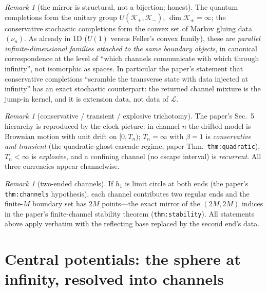 \documentclass[11pt]{article}
\theoremstyle{remark}
\newtheorem{remark}[theorem]{Remark}
\begin{document}
\begin{remark}[the mirror is structural, not a bijection; honest]
The quantum completions form the unitary group
$U(\mathcal K_{+},\mathcal K_{-})$, $\dim\mathcal K_{\pm}=\infty$; the
conservative stochastic completions form the convex set of Markov
gluing data $(\nu_{n})$.  As already in 1D ($U(1)$ versus Feller's
convex family), these are \emph{parallel infinite-dimensional families
attached to the same boundary objects}, in canonical correspondence at
the level of ``which channels communicate with which through
infinity'', not isomorphic as spaces.  In particular the paper's
statement that conservative completions ``scramble the transverse
state with data injected at infinity'' has an exact stochastic
counterpart: the returned channel mixture is the jump-in kernel, and it
is extension data, not data of $\mathcal L$.
\end{remark}

\begin{remark}[conservative / transient / explosive trichotomy]
The paper's Sec.~5 hierarchy is reproduced by the clock picture: in
channel $n$ the drifted model is Brownian motion with unit drift on
$[0,T_{n})$; $T_{n}=\infty$ with $\beta=1$ is \emph{conservative and
transient} (the quadratic-ghost cascade regime, paper
Thm.~\texttt{thm:quadratic}), $T_{n}<\infty$ is \emph{explosive}, and a
confining channel (no escape interval) is \emph{recurrent}.  All three
currencies appear channelwise.
\end{remark}

\begin{remark}[two-ended channels]
If $h_{1}$ is limit circle at both ends (the paper's
\texttt{thm:channels} hypothesis), each channel contributes two regular
ends and the finite-$M$ boundary set has $2M$ points---the exact mirror
of the $(2M,2M)$ indices in the paper's finite-channel stability
theorem (\texttt{thm:stability}).  All statements above apply verbatim
with the reflecting base replaced by the second end's data.
\end{remark}

\section{Central potentials: the sphere at infinity, resolved into
channels}
\end{document}
